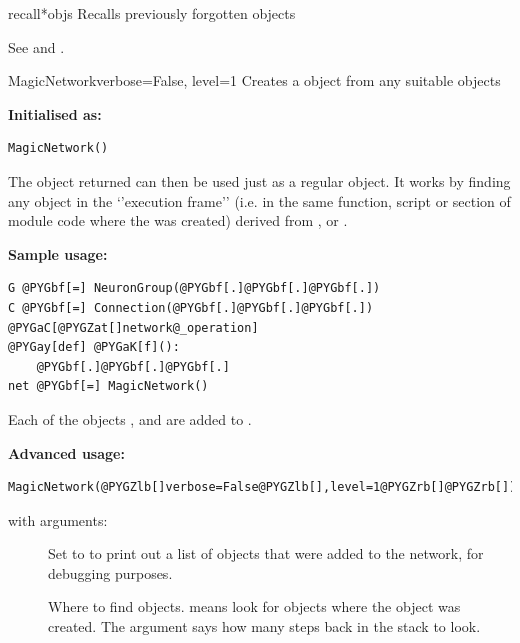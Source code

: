 \documentclass[letterpaper,10pt,english]{manual}
\begin{document}
\hypertarget{brian.recall}{}\begin{funcdesc}{recall}{*objs}
Recalls previously forgotten objects

See \hyperlink{brian.forget}{} and \hyperlink{brian.clear}{}.
\end{funcdesc}

\hypertarget{brian.MagicNetwork}{}\begin{classdesc}{MagicNetwork}{verbose=False, level=1}
Creates a \hyperlink{brian.Network}{} object from any suitable objects

\textbf{Initialised as:}

\begin{Verbatim}[commandchars=@\[\]]
MagicNetwork()
\end{Verbatim}

The object returned can then be used just as a regular
\hyperlink{brian.Network}{} object. It works by finding any object in
the `'execution frame'' (i.e. in the same function, script
or section of module code where the \hyperlink{brian.MagicNetwork}{} was
created) derived from \hyperlink{brian.NeuronGroup}{}, \hyperlink{brian.Connection}{} or
\hyperlink{brian.NetworkOperation}{}.

\textbf{Sample usage:}

\begin{Verbatim}[commandchars=@\[\]]
G @PYGbf[=] NeuronGroup(@PYGbf[.]@PYGbf[.]@PYGbf[.])
C @PYGbf[=] Connection(@PYGbf[.]@PYGbf[.]@PYGbf[.])
@PYGaC[@PYGZat[]network@_operation]
@PYGay[def] @PYGaK[f]():
    @PYGbf[.]@PYGbf[.]@PYGbf[.]
net @PYGbf[=] MagicNetwork()
\end{Verbatim}

Each of the objects ,  and  are added to .

\textbf{Advanced usage:}

\begin{Verbatim}[commandchars=@\[\]]
MagicNetwork(@PYGZlb[]verbose=False@PYGZlb[],level=1@PYGZrb[]@PYGZrb[])
\end{Verbatim}

with arguments:
\begin{description}
\item[]
Set to  to print out a list of objects that were
added to the network, for debugging purposes.

\item[]
Where to find objects.  means look for objects
where the \hyperlink{brian.MagicNetwork}{} object was created. The 
argument says how many steps back in the stack to look.

\end{description}
\end{classdesc}
\end{document}
